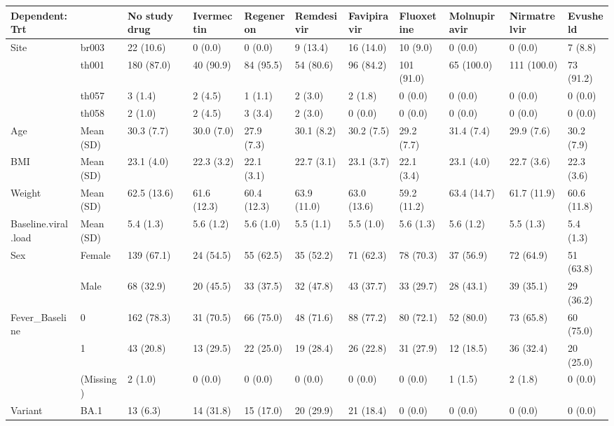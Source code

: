
\begin{tabular}{l|l|l|l|l|l|l|l|l|l|l}
\hline
Dependent: Trt &   & No study drug & Ivermectin & Regeneron & Remdesivir & Favipiravir & Fluoxetine & Molnupiravir & Nirmatrelvir & Evusheld\\
\hline
Site & br003 & 22 (10.6) & 0 (0.0) & 0 (0.0) & 9 (13.4) & 16 (14.0) & 10 (9.0) & 0 (0.0) & 0 (0.0) & 7 (8.8)\\
\hline
 & th001 & 180 (87.0) & 40 (90.9) & 84 (95.5) & 54 (80.6) & 96 (84.2) & 101 (91.0) & 65 (100.0) & 111 (100.0) & 73 (91.2)\\
\hline
 & th057 & 3 (1.4) & 2 (4.5) & 1 (1.1) & 2 (3.0) & 2 (1.8) & 0 (0.0) & 0 (0.0) & 0 (0.0) & 0 (0.0)\\
\hline
 & th058 & 2 (1.0) & 2 (4.5) & 3 (3.4) & 2 (3.0) & 0 (0.0) & 0 (0.0) & 0 (0.0) & 0 (0.0) & 0 (0.0)\\
\hline
Age & Mean (SD) & 30.3 (7.7) & 30.0 (7.0) & 27.9 (7.3) & 30.1 (8.2) & 30.2 (7.5) & 29.2 (7.7) & 31.4 (7.4) & 29.9 (7.6) & 30.2 (7.9)\\
\hline
BMI & Mean (SD) & 23.1 (4.0) & 22.3 (3.2) & 22.1 (3.1) & 22.7 (3.1) & 23.1 (3.7) & 22.1 (3.4) & 23.1 (4.0) & 22.7 (3.6) & 22.3 (3.6)\\
\hline
Weight & Mean (SD) & 62.5 (13.6) & 61.6 (12.3) & 60.4 (12.3) & 63.9 (11.0) & 63.0 (13.6) & 59.2 (11.2) & 63.4 (14.7) & 61.7 (11.9) & 60.6 (11.8)\\
\hline
Baseline.viral.load & Mean (SD) & 5.4 (1.3) & 5.6 (1.2) & 5.6 (1.0) & 5.5 (1.1) & 5.5 (1.0) & 5.6 (1.3) & 5.6 (1.2) & 5.5 (1.3) & 5.4 (1.3)\\
\hline
Sex & Female & 139 (67.1) & 24 (54.5) & 55 (62.5) & 35 (52.2) & 71 (62.3) & 78 (70.3) & 37 (56.9) & 72 (64.9) & 51 (63.8)\\
\hline
 & Male & 68 (32.9) & 20 (45.5) & 33 (37.5) & 32 (47.8) & 43 (37.7) & 33 (29.7) & 28 (43.1) & 39 (35.1) & 29 (36.2)\\
\hline
Fever\_Baseline & 0 & 162 (78.3) & 31 (70.5) & 66 (75.0) & 48 (71.6) & 88 (77.2) & 80 (72.1) & 52 (80.0) & 73 (65.8) & 60 (75.0)\\
\hline
 & 1 & 43 (20.8) & 13 (29.5) & 22 (25.0) & 19 (28.4) & 26 (22.8) & 31 (27.9) & 12 (18.5) & 36 (32.4) & 20 (25.0)\\
\hline
 & (Missing) & 2 (1.0) & 0 (0.0) & 0 (0.0) & 0 (0.0) & 0 (0.0) & 0 (0.0) & 1 (1.5) & 2 (1.8) & 0 (0.0)\\
\hline
Variant & BA.1 & 13 (6.3) & 14 (31.8) & 15 (17.0) & 20 (29.9) & 21 (18.4) & 0 (0.0) & 0 (0.0) & 0 (0.0) & 0 (0.0)\\

\end{tabular}
